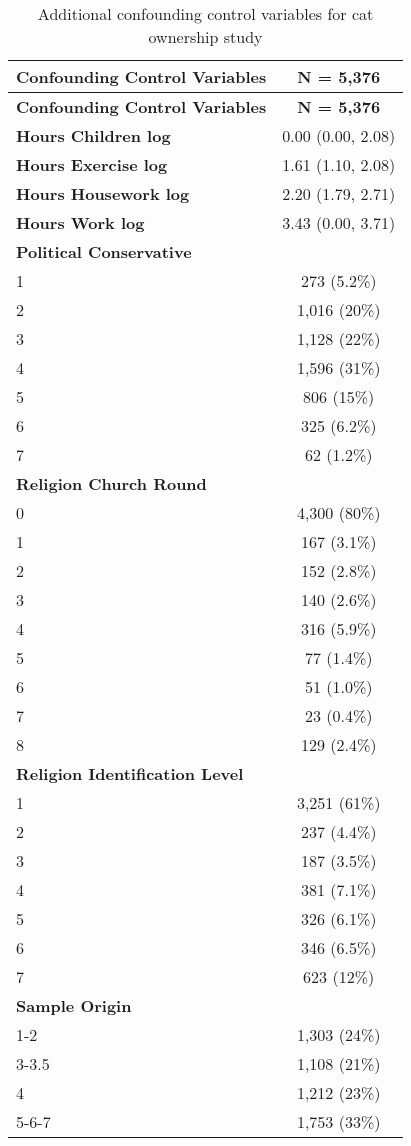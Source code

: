 \documentclass[
  singlecolumn,
  9pt]{article}
\begin{document}
\hypertarget{tbl-table_confounding_control_vars_cats}{}
\begin{longtable}[]{@{}lc@{}}
\caption{\label{tbl-table_confounding_control_vars_cats}Additional
confounding control variables for cat ownership study}\tabularnewline
\toprule\noalign{}
\textbf{Confounding Control Variables} & \textbf{N = 5,376} \\
\midrule\noalign{}
\endfirsthead
\toprule\noalign{}
\textbf{Confounding Control Variables} & \textbf{N = 5,376} \\
\midrule\noalign{}
\endhead
\bottomrule\noalign{}
\endlastfoot
\textbf{Hours Children log} & 0.00 (0.00, 2.08) \\
\textbf{Hours Exercise log} & 1.61 (1.10, 2.08) \\
\textbf{Hours Housework log} & 2.20 (1.79, 2.71) \\
\textbf{Hours Work log} & 3.43 (0.00, 3.71) \\
\textbf{Political Conservative} & \\
1 & 273 (5.2\%) \\
2 & 1,016 (20\%) \\
3 & 1,128 (22\%) \\
4 & 1,596 (31\%) \\
5 & 806 (15\%) \\
6 & 325 (6.2\%) \\
7 & 62 (1.2\%) \\
\textbf{Religion Church Round} & \\
0 & 4,300 (80\%) \\
1 & 167 (3.1\%) \\
2 & 152 (2.8\%) \\
3 & 140 (2.6\%) \\
4 & 316 (5.9\%) \\
5 & 77 (1.4\%) \\
6 & 51 (1.0\%) \\
7 & 23 (0.4\%) \\
8 & 129 (2.4\%) \\
\textbf{Religion Identification Level} & \\
1 & 3,251 (61\%) \\
2 & 237 (4.4\%) \\
3 & 187 (3.5\%) \\
4 & 381 (7.1\%) \\
5 & 326 (6.1\%) \\
6 & 346 (6.5\%) \\
7 & 623 (12\%) \\
\textbf{Sample Origin} & \\
1-2 & 1,303 (24\%) \\
3-3.5 & 1,108 (21\%) \\
4 & 1,212 (23\%) \\
5-6-7 & 1,753 (33\%) \\
\end{longtable}
\end{document}
